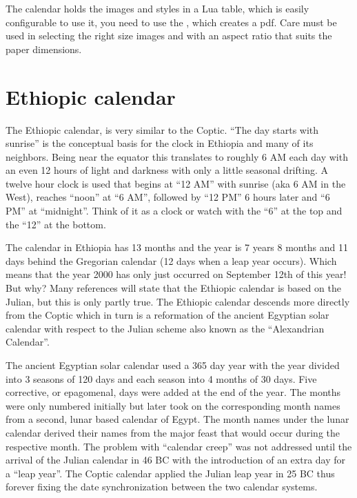 The calendar holds the images and styles in  a Lua table, which is easily configurable to use it, you need to
use the \cmd{\makeCalendar}, which creates a pdf. Care must be used in selecting the right size images and with an aspect ratio that suits the paper dimensions. 

\clearpage



\section{Ethiopic calendar}

The Ethiopic calendar, is very similar to the Coptic. “The day starts with sunrise” is the conceptual basis for the clock in Ethiopia and many of its neighbors. Being near the equator this translates to roughly 6 AM each day with an even 12 hours of light and darkness with only a little seasonal drifting. A twelve hour clock is used that begins at “12 AM” with sunrise (aka 6 AM in the West), reaches “noon” at “6 AM”, followed by “12 PM” 6 hours later and “6 PM” at “midnight”. Think of it as a clock or watch with the “6” at the top and the “12” at the bottom.

The calendar in Ethiopia has 13 months and the year is 7 years 8 months and 11 days behind the Gregorian calendar (12 days when a leap year occurs). Which means that the year 2000 has only just occurred on September 12th of this year! But why? Many references will state that the Ethiopic calendar is based on the Julian, but this is only partly true. The Ethiopic calendar descends more directly from the Coptic which in turn is a reformation of the ancient Egyptian solar calendar with respect to the Julian scheme also known as the “Alexandrian Calendar”.

The ancient Egyptian solar calendar used a 365 day year with the year divided into 3 seasons of 120 days and each season into 4 months of 30 days. Five corrective, or epagomenal, days were added at the end of the year. The months were only numbered initially but later took on the corresponding month names from a second, lunar based calendar of Egypt. The month names under the lunar calendar derived their names from the major feast that would occur during the respective month. The problem with “calendar creep” was not addressed until the arrival of the Julian calendar in 46 BC with the introduction of an extra day for a “leap year”. The Coptic calendar applied the Julian leap year in 25 BC thus forever fixing the date synchronization between the two calendar systems.

